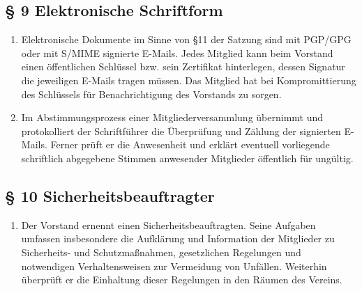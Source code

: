 \documentclass[10pt,a4paper]{article}
\begin{document}
\subsection*{§ 9 Elektronische Schriftform}
\begin{enumerate}
\item Elektronische Dokumente im Sinne von §11 der Satzung sind mit PGP/GPG
	oder mit S/MIME signierte E-Mails. Jedes Mitglied kann beim Vorstand
	einen öffentlichen Schlüssel bzw. sein Zertifikat hinterlegen, dessen
	Signatur die jeweiligen E-Mails tragen müssen. Das Mitglied hat bei
	Kompromittierung des Schlüssels für Benachrichtigung des Vorstands
	zu sorgen.
\item Im Abstimmungsprozess einer Mitgliederversammlung
	übernimmt und protokolliert der Schriftführer die Überprüfung und
	Zählung der signierten E-Mails. Ferner prüft er die Anwesenheit und
	erklärt eventuell vorliegende schriftlich abgegebene Stimmen anwesender
	Mitglieder öffentlich für ungültig.
\end{enumerate}

\subsection*{§ 10 Sicherheitsbeauftragter}
\begin{enumerate}
\item Der Vorstand ernennt einen Sicherheitsbeauftragten. Seine Aufgaben
	umfassen insbesondere die Aufklärung und Information der Mitglieder
	zu Sicherheits- und Schutzmaßnahmen, gesetzlichen Regelungen und
	notwendigen Verhaltensweisen zur Vermeidung von Unfällen. Weiterhin
	überprüft er die Einhaltung dieser Regelungen in den Räumen des
	Vereins.
\end{enumerate}
\end{document}
